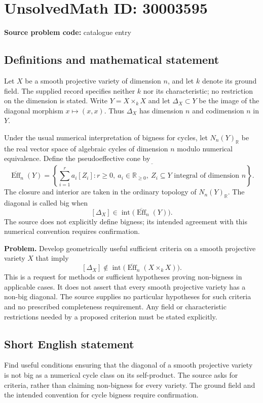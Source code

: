 \documentclass[11pt]{article}
\newcommand{\R}{\mathbb{R}}
\begin{document}
\section*{UnsolvedMath ID: 30003595}
\textbf{Source problem code:} catalogue entry
\subsection{Definitions and mathematical statement}
Let \(X\) be a smooth projective variety of dimension \(n\), and let \(k\) denote its ground field. The supplied record specifies neither \(k\) nor its characteristic; no restriction on the dimension is stated. Write \(Y=X\times_k X\) and let \(\Delta_X\subset Y\) be the image of the diagonal morphism \(x\mapsto(x,x)\). Thus \(\Delta_X\) has dimension \(n\) and codimension \(n\) in \(Y\).

Under the usual numerical interpretation of bigness for cycles, let \(N_n(Y)_{\R}\) be the real vector space of algebraic cycles of dimension \(n\) modulo numerical equivalence. Define the pseudoeffective cone by
\[
\overline{\operatorname{Eff}}_n(Y)
=\overline{\left\{\sum_{i=1}^{r}a_i[Z_i]: r\geq 0,\ a_i\in\R_{\geq 0},\ Z_i\subseteq Y\text{ integral of dimension }n\right\}}.
\]
The closure and interior are taken in the ordinary topology of \(N_n(Y)_{\R}\). The diagonal is called big when
\[
[\Delta_X]\in\operatorname{int}\bigl(\overline{\operatorname{Eff}}_n(Y)\bigr).
\]
The source does not explicitly define bigness; its intended agreement with this numerical convention requires confirmation.

\textbf{Problem.} Develop geometrically useful sufficient criteria on a smooth projective variety \(X\) that imply
\[
[\Delta_X]\notin\operatorname{int}\bigl(\overline{\operatorname{Eff}}_n(X\times_k X)\bigr).
\]
This is a request for methods or sufficient hypotheses proving non-bigness in applicable cases. It does not assert that every smooth projective variety has a non-big diagonal. The source supplies no particular hypotheses for such criteria and no prescribed completeness requirement. Any field or characteristic restrictions needed by a proposed criterion must be stated explicitly.
\subsection{Short English statement}
Find useful conditions ensuring that the diagonal of a smooth projective variety is not big as a numerical cycle class on its self-product. The source asks for criteria, rather than claiming non-bigness for every variety. The ground field and the intended convention for cycle bigness require confirmation.
\end{document}
